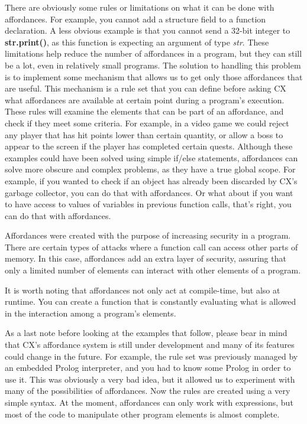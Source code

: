 \documentclass[11pt,fleqn,openany]{book} %
\begin{document}
There are obviously some rules or limitations on what it can be done with affordances. For example, you cannot add a structure field to a function declaration. A less obvious example is that you cannot send a 32-bit integer to \textbf{str.print()}, as this function is expecting an argument of type \emph{str}. These limitations help reduce the number of affordances in a program, but they can still be a lot, even in relatively small programs. The solution to handling this problem is to implement some mechanism that allows us to get only those affordances that are useful. This mechanism is a rule set that you can define before asking CX what affordances are available at certain point during a program's execution. These rules will examine the elements that can be part of an affordance, and check if they meet some criteria. For example, in a video game we could reject any player that has hit points lower than certain quantity, or allow a boss to appear to the screen if the player has completed certain quests. Although these examples could have been solved using simple if/else statements, affordances can solve more obscure and complex problems, as they have a true global scope. For example, if you wanted to check if an object has already been discarded by CX's garbage collector, you can do that with affordances. Or what about if you want to have access to values of variables in previous function calls, that's right, you can do that with affordances.

Affordances were created with the purpose of increasing security in a program. There are certain types of attacks where a function call can access other parts of memory. In this case, affordances add an extra layer of security, assuring that only a limited number of elements can interact with other elements of a program.

It is worth noting that affordances not only act at compile-time, but also at runtime. You can create a function that is constantly evaluating what is allowed in the interaction among a program's elements.

As a last note before looking at the examples that follow, please bear in mind that CX's affordance system is still under development and many of its features could change in the future. For example, the rule set was previously managed by an embedded Prolog interpreter, and you had to know some Prolog in order to use it. This was obviously a very bad idea, but it allowed us to experiment with many of the possibilities of affordances. Now the rules are created using a very simple syntax. At the moment, affordances can only work with expressions, but most of the code to manipulate other program elements is almost complete.
\end{document}

